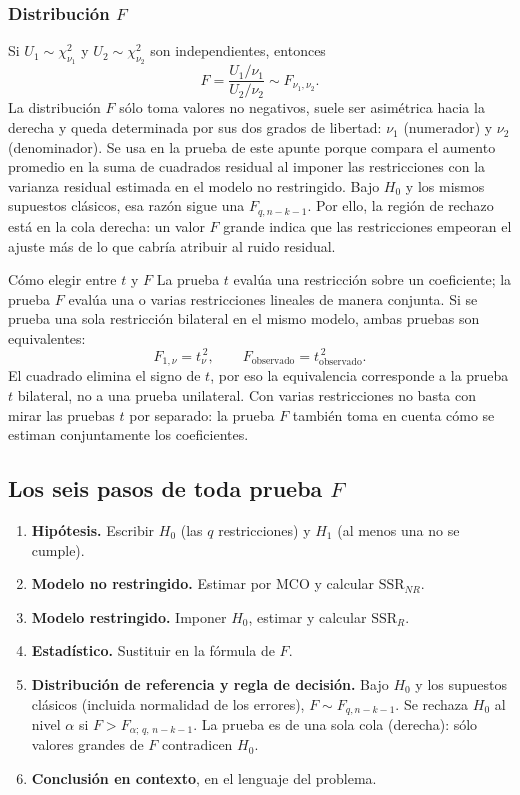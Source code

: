 \documentclass[11pt,letterpaper]{article}
\newcommand{\SSR}{\mathrm{SSR}}
\begin{document}
\subsubsection*{Distribución $F$}
Si $U_1\sim\chi^2_{\nu_1}$ y $U_2\sim\chi^2_{\nu_2}$ son independientes, entonces
\[
F=\frac{U_1/\nu_1}{U_2/\nu_2}\sim F_{\nu_1,\nu_2}.
\]
La distribución $F$ sólo toma valores no negativos, suele ser asimétrica hacia la derecha y queda
determinada por sus dos grados de libertad: $\nu_1$ (numerador) y $\nu_2$ (denominador). Se usa en
la prueba de este apunte porque compara el aumento promedio en la suma de cuadrados residual al
imponer las restricciones con la varianza residual estimada en el modelo no restringido. Bajo
$H_0$ y los mismos supuestos clásicos, esa razón sigue una $F_{q,n-k-1}$. Por ello, la región de
rechazo está en la cola derecha: un valor $F$ grande indica que las restricciones empeoran el
ajuste más de lo que cabría atribuir al ruido residual.

\begin{nota}{Cómo elegir entre $t$ y $F$}
La prueba $t$ evalúa una restricción sobre un coeficiente; la prueba $F$ evalúa una o varias
restricciones lineales de manera conjunta. Si se prueba una sola restricción bilateral en el mismo
modelo, ambas pruebas son equivalentes:
\[
F_{1,\nu}=t_{\nu}^{\,2},\qquad
F_{\text{observado}}=t_{\text{observado}}^{\,2}.
\]
El cuadrado elimina el signo de $t$, por eso la equivalencia corresponde a la prueba $t$ bilateral,
no a una prueba unilateral. Con varias restricciones no basta con mirar las pruebas $t$ por
separado: la prueba $F$ también toma en cuenta cómo se estiman conjuntamente los coeficientes.
\end{nota}

\subsection{Los seis pasos de toda prueba $F$}

\begin{enumerate}[leftmargin=1.5em,itemsep=1pt]
\item \textbf{Hipótesis.} Escribir $H_0$ (las $q$ restricciones) y $H_1$ (al menos una no se cumple).
\item \textbf{Modelo no restringido.} Estimar por MCO y calcular $\SSR_{NR}$.
\item \textbf{Modelo restringido.} Imponer $H_0$, estimar y calcular $\SSR_R$.
\item \textbf{Estadístico.} Sustituir en la fórmula de $F$.
\item \textbf{Distribución de referencia y regla de decisión.} Bajo $H_0$ y los supuestos clásicos
(incluida normalidad de los errores), $F\sim F_{q,n-k-1}$. Se rechaza $H_0$ al nivel $\alpha$ si
$F>F_{\alpha;\,q,\,n-k-1}$. La prueba es de una sola cola (derecha): sólo valores grandes de $F$
contradicen $H_0$.
\item \textbf{Conclusión en contexto}, en el lenguaje del problema.
\end{enumerate}
\end{document}

